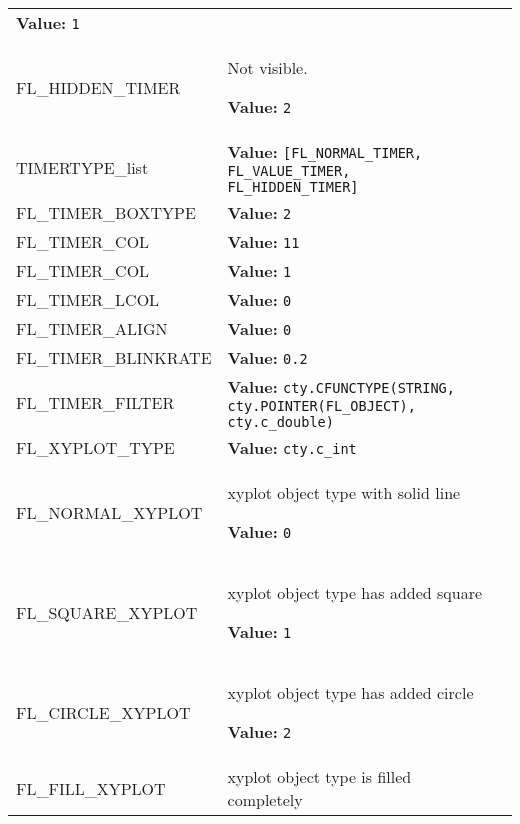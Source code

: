 \begin{longtable}{|p{\varnamewidth}|p{\vardescrwidth}|l}
\textbf{Value:} 
{\tt 1}&\\
\cline{1-2}
\raggedright F\-L\-\_\-H\-I\-D\-D\-E\-N\-\_\-T\-I\-M\-E\-R\- & \raggedright Not visible.

\textbf{Value:} 
{\tt 2}&\\
\cline{1-2}
\raggedright T\-I\-M\-E\-R\-T\-Y\-P\-E\-\_\-l\-i\-s\-t\- & \raggedright \textbf{Value:} 
{\tt [FL\_NORMAL\_TIMER, FL\_VALUE\_TIMER, FL\_HIDDEN\_TIMER]}&\\
\cline{1-2}
\raggedright F\-L\-\_\-T\-I\-M\-E\-R\-\_\-B\-O\-X\-T\-Y\-P\-E\- & \raggedright \textbf{Value:} 
{\tt 2}&\\
\cline{1-2}
\raggedright F\-L\-\_\-T\-I\-M\-E\-R\-\_\-C\-O\-L\-1\- & \raggedright \textbf{Value:} 
{\tt 11}&\\
\cline{1-2}
\raggedright F\-L\-\_\-T\-I\-M\-E\-R\-\_\-C\-O\-L\-2\- & \raggedright \textbf{Value:} 
{\tt 1}&\\
\cline{1-2}
\raggedright F\-L\-\_\-T\-I\-M\-E\-R\-\_\-L\-C\-O\-L\- & \raggedright \textbf{Value:} 
{\tt 0}&\\
\cline{1-2}
\raggedright F\-L\-\_\-T\-I\-M\-E\-R\-\_\-A\-L\-I\-G\-N\- & \raggedright \textbf{Value:} 
{\tt 0}&\\
\cline{1-2}
\raggedright F\-L\-\_\-T\-I\-M\-E\-R\-\_\-B\-L\-I\-N\-K\-R\-A\-T\-E\- & \raggedright \textbf{Value:} 
{\tt 0.2}&\\
\cline{1-2}
\raggedright F\-L\-\_\-T\-I\-M\-E\-R\-\_\-F\-I\-L\-T\-E\-R\- & \raggedright \textbf{Value:} 
{\tt cty.CFUNCTYPE(STRING, cty.POINTER(FL\_OBJECT), cty.c\_double)}&\\
\cline{1-2}
\raggedright F\-L\-\_\-X\-Y\-P\-L\-O\-T\-\_\-T\-Y\-P\-E\- & \raggedright \textbf{Value:} 
{\tt cty.c\_int}&\\
\cline{1-2}
\raggedright F\-L\-\_\-N\-O\-R\-M\-A\-L\-\_\-X\-Y\-P\-L\-O\-T\- & \raggedright xyplot object type with solid line

\textbf{Value:} 
{\tt 0}&\\
\cline{1-2}
\raggedright F\-L\-\_\-S\-Q\-U\-A\-R\-E\-\_\-X\-Y\-P\-L\-O\-T\- & \raggedright xyplot object type has added square

\textbf{Value:} 
{\tt 1}&\\
\cline{1-2}
\raggedright F\-L\-\_\-C\-I\-R\-C\-L\-E\-\_\-X\-Y\-P\-L\-O\-T\- & \raggedright xyplot object type has added circle

\textbf{Value:} 
{\tt 2}&\\
\cline{1-2}
\raggedright F\-L\-\_\-F\-I\-L\-L\-\_\-X\-Y\-P\-L\-O\-T\- & \raggedright xyplot object type is filled completely


\end{longtable}
